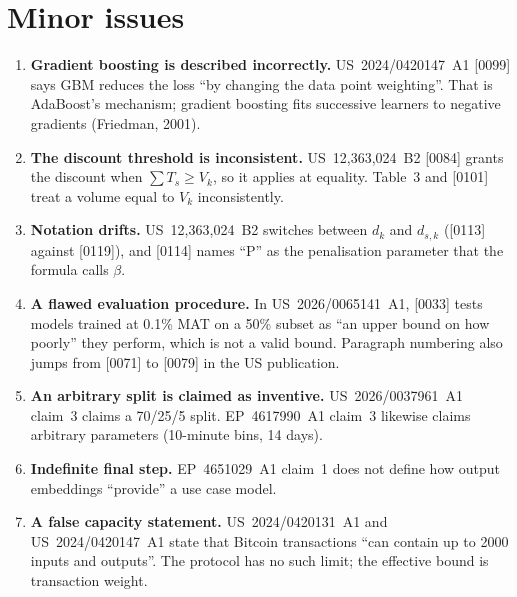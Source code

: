 \documentclass[10pt,a4paper]{article}
\begin{document}
\section{Minor issues}
\begin{enumerate}[label=m\arabic*.,leftmargin=2.2em]
  \item \textbf{Gradient boosting is described incorrectly.} US~2024/0420147~A1 [0099] says GBM reduces the loss ``by changing the data point weighting''. That is AdaBoost's mechanism; gradient boosting fits successive learners to negative gradients (Friedman, 2001).
  \item \textbf{The discount threshold is inconsistent.} US~12,363,024~B2 [0084] grants the discount when $\sum T_s\ge V_k$, so it applies at equality. Table~3 and [0101] treat a volume equal to $V_k$ inconsistently.
  \item \textbf{Notation drifts.} US~12,363,024~B2 switches between $d_k$ and $d_{s,k}$ ([0113] against [0119]), and [0114] names ``P'' as the penalisation parameter that the formula calls $\beta$.
  \item \textbf{A flawed evaluation procedure.} In US~2026/0065141~A1, [0033] tests models trained at 0.1\% MAT on a 50\% subset as ``an upper bound on how poorly'' they perform, which is not a valid bound. Paragraph numbering also jumps from [0071] to [0079] in the US publication.
  \item \textbf{An arbitrary split is claimed as inventive.} US~2026/0037961~A1 claim~3 claims a 70/25/5 split. EP~4617990~A1 claim~3 likewise claims arbitrary parameters (10-minute bins, 14 days).
  \item \textbf{Indefinite final step.} EP~4651029~A1 claim~1 does not define how output embeddings ``provide'' a use case model.
  \item \textbf{A false capacity statement.} US~2024/0420131~A1 and US~2024/0420147~A1 state that Bitcoin transactions ``can contain up to 2000 inputs and outputs''. The protocol has no such limit; the effective bound is transaction weight.
\end{enumerate}

\end{document}
